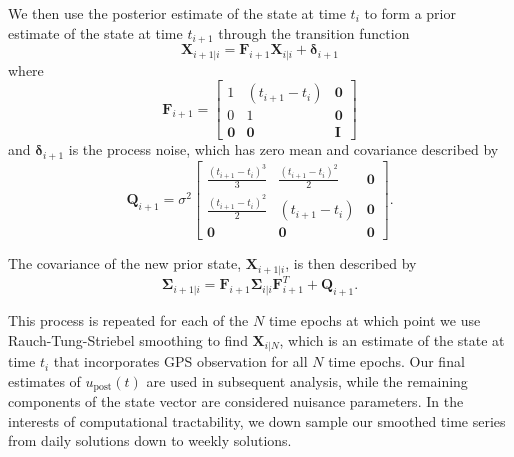 \documentclass[1p]{elsarticle}
\begin{document}
We then use the posterior estimate of the state at time $t_i$ to form a prior estimate of the state at time $t_{i+1}$ through the transition function
\begin{equation}\label{predict}
  \mathbf{X}_{i+1|i} = \mathbf{F}_{i+1}\mathbf{X}_{i|i} + \mathbf{\delta}_{i+1} 
\end{equation}
where 
\begin{equation}
  \mathbf{F}_{i+1} = 
  \left[
  \begin{array}{ccc}
    1           & (t_{i+1} - t_i) & \mathbf{0}\\
    0           & 1              & \mathbf{0}\\
    \mathbf{0}  & \mathbf{0}     & \mathbf{I}
  \end{array}
  \right]
\end{equation}
and $\mathbf{\delta}_{i+1}$ is the process noise, which has zero mean and covariance described by
\begin{equation}
  \mathbf{Q}_{i+1} = 
  \sigma^2 \left[
  \begin{array}{ccc}
  \frac{(t_{i+1} - t_i)^3}{3} & \frac{(t_{i+1} - t_{i})^2}{2} & \mathbf{0}\\
  \frac{(t_{i+1} - t_i)^2}{2} & (t_{i+1} - t_{i}) & \mathbf{0}\\ 
  \mathbf{0} & \mathbf{0} & \mathbf{0}
  \end{array}
  \right].
\end{equation}

The covariance of the new prior state, $\mathbf{X}_{i+1|i}$, is then described by
\begin{equation}
  \mathbf{\Sigma}_{i+1|i} = \mathbf{F}_{i+1}\mathbf{\Sigma}_{i|i}\mathbf{F}^T_{i+1} + \mathbf{Q}_{i+1}.
\end{equation}

This process is repeated for each of the $N$ time epochs at which point we use Rauch-Tung-Striebel smoothing \citep{Rauch1965} to find $\mathbf{X}_{i|N}$, which is an estimate of the state at time $t_i$ that incorporates GPS observation for all $N$ time epochs.  Our final estimates of $u_\mathrm{post}(t)$ are used in subsequent analysis, while the remaining components of the state vector are considered nuisance parameters. In the interests of computational tractability, we down sample our smoothed time series from daily solutions down to weekly solutions.
\end{document}
